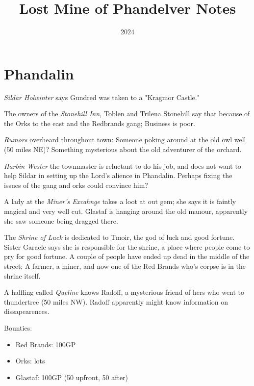 \documentclass{article}
\title{Lost Mine of Phandelver Notes}
\date{2024}
\begin{document}
\maketitle
\section{Phandalin}
\emph{Sildar Holwinter} says Gundred was taken to a "Kragmor Castle."

The owners of the \emph{Stonehill Inn,} Toblen and Trilena Stonehill say that because of the Orks to the east and the Redbrands gang; Business is poor.

\emph{Rumors} overheard throughout town:
Someone poking around at the old owl well (50 miles NE)?
Something mysterious about the old adventurer of the orchard.

\emph{Harbin Wester} the townmaster is reluctant to do his job, and does not want to help Sildar in setting up the Lord's alience in Phandalin. Perhaps fixing the issues of the gang and orks could convince him?

A lady at the \emph{Miner's Excahnge} takes a loot at out gem; she says it is faintly magical and very well cut. Glastaf is hanging around the old manour, apparently she saw someone being dragged there.

The \emph{Shrine of Luck} is dedicated to Tmoir, the god of luck and good fortune. Sister Garaele says she is responsible for the shrine, a place where people come to pry for good fortune. A couple of people have ended up dead in the middle of the street; A farmer, a miner, and now one of the Red Brands who's corpse is in the shrine itself.

A halfling called \emph{Queline} knows Radoff, a mysterious friend of hers who went to thundertree (50 miles NW). Radoff apparently might know information on dissapearences.

Bounties:
\begin{itemize}
	\item Red Brands: 100GP
	\item Orks: lots
	\item Glastaf: 100GP (50 upfront, 50 after)
\end{itemize}
\end{document}
